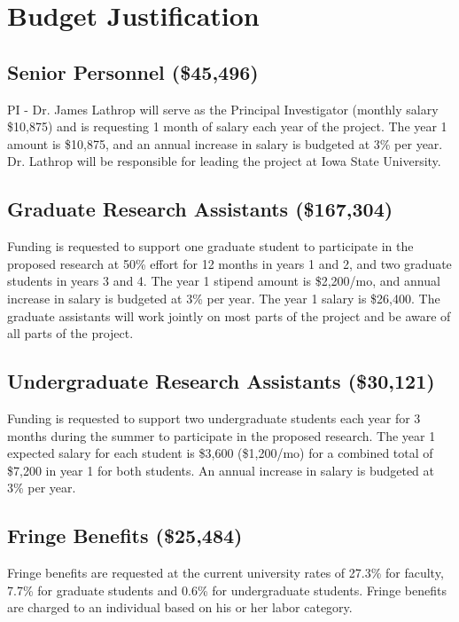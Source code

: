 \documentclass[12pt,letterpaper]{article}
\begin{document}
	\section*{Budget Justification}
	
	\subsection*{Senior Personnel (\$45,496)}
	
	PI - Dr. James Lathrop will serve as the Principal Investigator (monthly salary \$10,875) and is requesting 1 month of salary each year of the project.  The year 1 amount is \$10,875, and an annual increase in salary is budgeted at 3\% per year.  Dr. Lathrop will be responsible for leading the project at Iowa State University.
	
	\subsection*{Graduate Research Assistants (\$167,304)}
	Funding is requested to support one graduate student to participate in the proposed research at 50\% effort for 12 months in years 1 and 2, and two graduate students in years 3 and 4.   
	The year 1 stipend amount is \$2,200/mo, and annual increase in salary is budgeted at 3\% per year. The year 1 salary is \$26,400.  The graduate assistants will work jointly on most parts of the project and be aware of all parts of the project.
	
	\subsection*{Undergraduate Research Assistants (\$30,121)}
	Funding is requested to support two undergraduate students each year for 3 months during the summer to participate in the proposed research.  The year 1 expected salary for each student is \$3,600 (\$1,200/mo) for a combined total of \$7,200 in year 1 for both students.
	An annual increase in salary is budgeted at 3\% per year.
	
	\subsection*{Fringe Benefits (\$25,484)}
	Fringe benefits are requested at the current university rates of 27.3\% for faculty, 7.7\% for graduate students and 0.6\% for undergraduate students.  Fringe benefits are charged to an individual based on his or her labor category.
	
\end{document}
